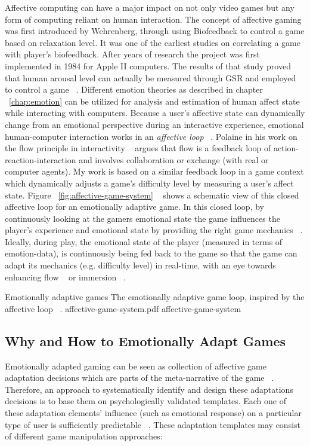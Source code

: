 Affective computing can have a major impact on not only video games but any form of computing reliant on human interaction. The concept of affective gaming was first introduced by Wehrenberg, through using Biofeedback to control a game based on relaxation level. It was one of the earliest studies on correlating a game with player's biofeedback. After years of research the project was first implemented in 1984 for Apple II computers. The results of that study proved that human arousal level can actually be measured through GSR and employed to control a game ~\cite{wehrenberg1995willball}. Different emotion theories as described in chapter ~\ref{chap:emotion} can be utilized for analysis and estimation of human affect state while interacting with computers. Because a user's affective state can dynamically change from an emotional perspective during an interactive experience, emotional human-computer interaction works in an \textit{affective loop} ~\cite{sundstrom2005user}. Polaine in his work on the flow principle in interactivity ~\cite{polaine2005flow} argues that flow is a feedback loop of action-reaction-interaction and involves collaboration or exchange (with real or computer agents). My work is based on a similar feedback loop in a game context which dynamically adjusts a game's difficulty level by measuring a user's affect state. Figure ~\ref{fig:affective-game-system} ~\cite{tijs2009creating} shows a schematic view of this closed affective loop for an emotionally adaptive game. In this closed loop, by continuously looking at the gamers emotional state the game influences the player's experience and emotional state by providing the right game mechanics ~\cite{hunicke2004mda}. Ideally, during play, the emotional state of the player (measured in terms of emotion-data), is continuously being fed back to the game so that the game can adapt its mechanics (e.g. difficulty level) in real-time, with an eye towards enhancing flow ~\cite{chen2007flow} or immersion ~\cite{nacke2008flow}.

\img
{Emotionally adaptive games}
{The emotionally adaptive game loop, inspired by the affective loop ~\cite{sundstrom2005user}.}
{affective-game-system.pdf}
{affective-game-system}

\subsection{Why and How to Emotionally Adapt Games}
Emotionally adapted gaming can be seen as collection of affective game adaptation decisions which are parts of the meta-narrative of the game ~\cite{saari2009emotionally}. Therefore, an approach to systematically identify and design these adaptations decisions is to base them on psychologically validated templates. Each one of these adaptation elements' influence (such as emotional response) on a particular type of user is sufficiently predictable ~\cite{saari2009emotionally}. These adaptation templates may consist of different game manipulation approaches:

